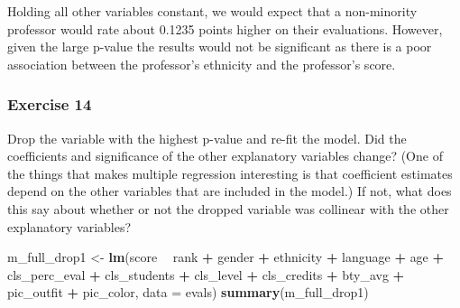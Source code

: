 \documentclass[
]{article}
\newenvironment{Shaded}{\begin{snugshade}}{\end{snugshade}}
\newcommand{\DataTypeTok}[1]{\textcolor[rgb]{0.13,0.29,0.53}{#1}}
\newcommand{\KeywordTok}[1]{\textcolor[rgb]{0.13,0.29,0.53}{\textbf{#1}}}
\newcommand{\NormalTok}[1]{#1}
\newcommand{\OperatorTok}[1]{\textcolor[rgb]{0.81,0.36,0.00}{\textbf{#1}}}
\newcommand{\StringTok}[1]{\textcolor[rgb]{0.31,0.60,0.02}{#1}}
\begin{document}
Holding all other variables constant, we would expect that a
non-minority professor would rate about 0.1235 points higher on their
evaluations. However, given the large p-value the results would not be
significant as there is a poor association between the professor's
ethnicity and the professor's score.

\hypertarget{exercise-14}{%
\subsubsection{Exercise 14}\label{exercise-14}}

Drop the variable with the highest p-value and re-fit the model. Did the
coefficients and significance of the other explanatory variables change?
(One of the things that makes multiple regression interesting is that
coefficient estimates depend on the other variables that are included in
the model.) If not, what does this say about whether or not the dropped
variable was collinear with the other explanatory variables?

\begin{Shaded}
\begin{Highlighting}[]
\NormalTok{m_full_drop1 <-}\StringTok{ }\KeywordTok{lm}\NormalTok{(score }\OperatorTok{~}\StringTok{ }\NormalTok{rank }\OperatorTok{+}\StringTok{ }\NormalTok{gender }\OperatorTok{+}\StringTok{ }\NormalTok{ethnicity }\OperatorTok{+}\StringTok{ }\NormalTok{language }\OperatorTok{+}\StringTok{ }\NormalTok{age }\OperatorTok{+}\StringTok{ }\NormalTok{cls_perc_eval }
             \OperatorTok{+}\StringTok{ }\NormalTok{cls_students }\OperatorTok{+}\StringTok{ }\NormalTok{cls_level }\OperatorTok{+}\StringTok{ }\NormalTok{cls_credits }\OperatorTok{+}\StringTok{ }\NormalTok{bty_avg }
             \OperatorTok{+}\StringTok{ }\NormalTok{pic_outfit }\OperatorTok{+}\StringTok{ }\NormalTok{pic_color, }\DataTypeTok{data =}\NormalTok{ evals)}
\KeywordTok{summary}\NormalTok{(m_full_drop1)}
\end{Highlighting}
\end{Shaded}
\end{document}
